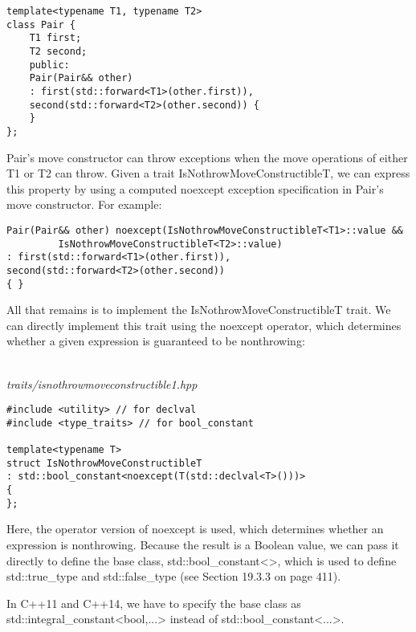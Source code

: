 \begin{lstlisting}[style=styleCXX]
template<typename T1, typename T2>
class Pair {
	T1 first;
	T2 second;
	public:
	Pair(Pair&& other)
	: first(std::forward<T1>(other.first)),
	second(std::forward<T2>(other.second)) {
	}
};
\end{lstlisting}

Pair’s move constructor can throw exceptions when the move operations of either T1 or T2 can throw. Given a trait IsNothrowMoveConstructibleT, we can express this property by using a computed noexcept exception specification in Pair’s move constructor. For example:

\begin{lstlisting}[style=styleCXX]
Pair(Pair&& other) noexcept(IsNothrowMoveConstructibleT<T1>::value &&
		 IsNothrowMoveConstructibleT<T2>::value)
: first(std::forward<T1>(other.first)),
second(std::forward<T2>(other.second))
{ }
\end{lstlisting}

All that remains is to implement the IsNothrowMoveConstructibleT trait. We can directly implement this trait using the noexcept operator, which determines whether a given expression is guaranteed to be nonthrowing:

\hspace*{\fill} \\ %
\noindent
\textit{traits/isnothrowmoveconstructible1.hpp}
\begin{lstlisting}[style=styleCXX]
#include <utility> // for declval
#include <type_traits> // for bool_constant

template<typename T>
struct IsNothrowMoveConstructibleT
: std::bool_constant<noexcept(T(std::declval<T>()))>
{
};
\end{lstlisting}

Here, the operator version of noexcept is used, which determines whether an expression is nonthrowing. Because the result is a Boolean value, we can pass it directly to define the base class, std::bool\_constant<>, which is used to define std::true\_type and std::false\_type (see Section 19.3.3 on page 411).

\begin{tcolorbox}[colback=webgreen!5!white,colframe=webgreen!75!black]
\hspace*{0.75cm} In C++11 and C++14, we have to specify the base class as std::integral\_constant<bool,...> instead of std::bool\_constant<...>.
\end{tcolorbox}

